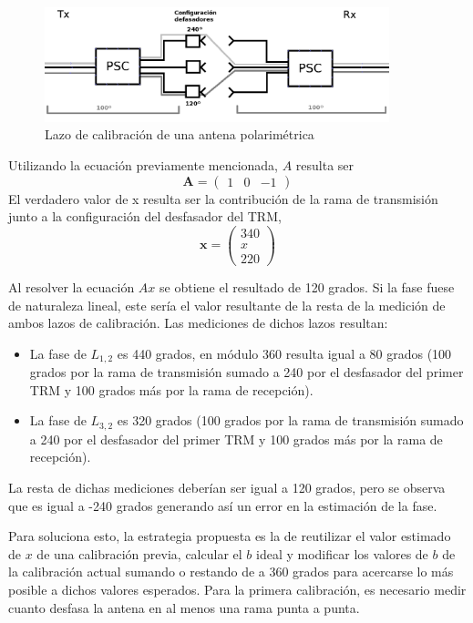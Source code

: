\begin{figure}[H]
 \centering
 \includegraphics[width=10cm]{gfx/loopCal.png}
 \caption{Lazo de calibración de una antena polarimétrica}
 \label{fig:phaseDetermination}
\end{figure}

Utilizando la ecuación previamente mencionada, $A$ resulta ser
$$
	\mathbf{A} = \begin{pmatrix} 1 & 0 & -1\end{pmatrix}
$$
El verdadero valor de x resulta ser la contribución de la rama de transmisión junto a la configuración del desfasador del TRM,
$$
	\mathbf{x} = \begin{pmatrix} 340 \\ x \\ 220\end{pmatrix}
$$

Al resolver la ecuación $Ax$ se obtiene el resultado de 120 grados. Si la fase fuese de naturaleza lineal, este sería el valor 
resultante de la resta de la medición de ambos lazos de calibración. Las mediciones de dichos lazos resultan: 
\begin{itemize}
	\item La fase de $L_{1,2}$ es 440 grados, en módulo 360 resulta igual a 80 grados (100 grados por la rama de
		transmisión sumado a 240 por el desfasador del primer TRM y 100 grados más por la rama de recepción).
	\item La fase de $L_{3, 2}$ es 320 grados (100 grados por la rama de transmisión sumado a 240 por el desfasador
		del primer TRM y 100 grados más por la rama de recepción).
\end{itemize}

La resta de dichas mediciones deberían ser igual a 120 grados, pero se observa que es igual a -240 grados generando así un
error en la estimación de la fase.

Para soluciona esto, la estrategia propuesta es la de reutilizar el valor estimado de $x$ de una calibración previa, calcular
el $b$ ideal y modificar los valores de $b$ de la calibración actual sumando o restando de a 360 grados para acercarse lo más 
posible a dichos valores esperados. Para la primera calibración, es necesario medir cuanto desfasa la antena en al menos una 
rama punta a punta. 


